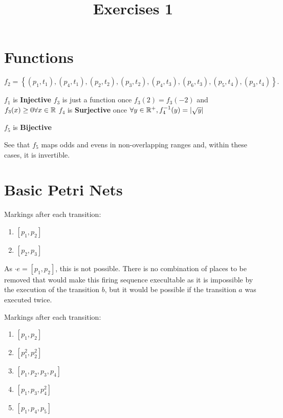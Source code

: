 \documentclass[a4paper]{report}
\title{Exercises 1}
\begin{document}
\maketitle

\section*{Functions}


\[
	f_2 = \left\{ \left( p_1,t_1 \right), \left( p_4,t_1 \right), \left( p_2,t_2 \right),\left( p_3,t_2 \right), \left( p_4,t_3 \right), \left( p_6,t_3 \right) ,\left( p_5,t_4 \right) , \left( p_3,t_4 \right)   \right\} 
.\] 


 $f_1$ is \textbf{Injective}
 $f_3$ is just a function once $f_3(2) = f_3(-2)$ and $f_3(x) \ge 0 \forall x\in \mathbb{R}$
 $f_4$ is \textbf{Surjective} once $\forall y\in \mathbb{R}^{+}, f_4^{-1}(y) = |\sqrt{y}| $

$f_5$ is \textbf{Bijective}

See that $f_5$ maps odds and evens in non-overlapping ranges and, within these cases, it is invertible.

\section*{Basic Petri Nets}




Markings after each transition:
\begin{enumerate}
	\item $\left[ p_1,p_2 \right] $
	\item $\left[ p_2,p_3 \right] $
\end{enumerate}
As $\cdot e = \left[ p_1,p_2 \right]$, this is not possible. There is no combination of places to be removed that would make this firing sequence execultable as it is impossible by the execution of the transition $b$, but it would be possible if the transition  $a$ was executed twice.


Markings after each transition:
\begin{enumerate}
	\item $\left[ p_1,p_2 \right] $
	\item $\left[ p_1^{2}, p_2^{2} \right] $ 
	\item $\left[ p_1,p_2,p_3,p_4 \right] $
	\item $\left[ p_1,p_3,p_4^{2} \right] $
	\item $\left[ p_1,p_4,p_5 \right] $
\end{enumerate}
\end{document}
